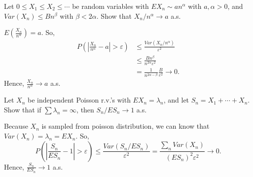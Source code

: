 \documentclass[en, normal, 11pt, black]{elegantnote}
\newenvironment{exercise}[1]{\begin{tcolorbox}[colback=black!15, colframe=black!80, breakable, title=#1]}{\end{tcolorbox}}
\newenvironment{solution}{\begin{tcolorbox}[colback=white, colframe=black!50, breakable, title=Solution. ]\setlength{\parskip}{0.8em}}{\end{tcolorbox}}
\begin{document}
    \begin{exercise}{2.3.18}
        Let $0 \leqslant X_{1} \leqslant X_{2} \leqslant \cdots$ be random variables with $E X_{n} \sim a n^{\alpha}$ with $a, \alpha>0$, and $Var \left(X_{n}\right) \leq B n^{\beta}$ with $\beta<2 \alpha .$ Show that $X_{n} / n^{\alpha} \rightarrow a$ a.s. 
    \end{exercise}

    \begin{solution}
        $E\left(\frac{X_n}{n^\alpha}\right)=a$. So, 
        \[
            \begin{aligned}
                P\left(\left|\frac{X_n}{n^\alpha}-a\right|>\varepsilon\right) &\leqslant \frac{Var(X_n/n^\alpha)}{\varepsilon^2}\\
                &\leqslant \frac{Bn^\beta}{n^{2\alpha}\varepsilon^2}\\
                &=\frac{1}{n^{2\alpha-\beta}}\frac{B}{\varepsilon^2}\to 0. 
            \end{aligned}
        \]
        Hence, $\frac{X_n}{n^\alpha}\to a$ a.s. 
    \end{solution}
    
    \begin{exercise}{2.3.19}
        Let $X_{n}$ be independent Poisson r.v.'s with $E X_{n}=\lambda_{n}$, and let $S_{n}=X_{1}+\cdots+X_{n}$. Show that if $\sum \lambda_{n}=\infty$, then $S_{n} / E S_{n} \rightarrow 1$ a.s. 
    \end{exercise}

    \begin{solution}
        Because $X_n$ is sampled from poisson distribution, we can know that $Var(X_n)=\lambda_n=EX_n$. So, 
        \[
            P\left(\left|\frac{S_n}{ES_n}-1\right|>\varepsilon\right)\leqslant\frac{Var(S_n/ES_n)}{\varepsilon^2}=\frac{\sum_{n}Var(X_n)}{(ES_n)^2\varepsilon^2}\to 0. 
        \]
        Hence, $\frac{S_n}{ES_n}\to 1$ a.s. 
    \end{solution}
\end{document}
